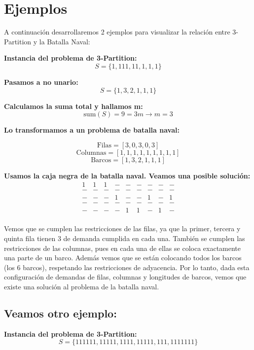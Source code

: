 

\section*{Ejemplos}

A continuación desarrollaremos 2 ejemplos para visualizar la relación entre 3-Partition y la Batalla Naval:

\textbf{Instancia del problema de 3-Partition:}
\[
S = \{1, 111, 11, 1, 1, 1\}
\]

\textbf{Pasamos a no unario:}
\[
S = \{1, 3, 2, 1, 1, 1\}
\]

\textbf{Calculamos la suma total y hallamos m:}
\[
\text{sum}(S) = 9 = 3m \rightarrow m = 3
\]

\textbf{Lo transformamos a un problema de batalla naval:}

\[
\text{Filas} = [3, 0, 3, 0, 3]
\]
\[
\text{Columnas} = [1, 1, 1, 1, 1, 1, 1, 1, 1]
\]
\[
\text{Barcos} = [1, 3, 2, 1, 1, 1]
\]

\textbf{Usamos la caja negra de la batalla naval. Veamos una posible solución:}
\[
\begin{array}{ccccccccc}
1 & 1 & 1 & - & - & - & - & - & - \\
- & - & - & - & - & - & - & - & - \\
- & - & - & 1 & - & - & 1 & - & 1 \\
- & - & - & - & - & - & - & - & - \\
- & - & - & - & 1 & 1 & - & 1 & - \\
\end{array}
\]

Vemos que se cumplen las restricciones de las filas, ya que la primer, tercera y quinta fila tienen 3 de demanda cumplida en cada una.
También se cumplen las restricciones de las columnas, pues en cada una de ellas se coloca exactamente una parte de un barco.
Además vemos que se están colocando todos los barcos (los 6 barcos), respetando las restricciones de adyacencia.
Por lo tanto, dada esta configuración de demandas de filas, columnas y longitudes de barcos, vemos que existe una solución al problema de la batalla naval.


\subsection{Veamos otro ejemplo:}

\textbf{Instancia del problema de 3-Partition:}
\[
S = \{111111, 11111, 1111, 11111, 111, 1111111\}
\]

